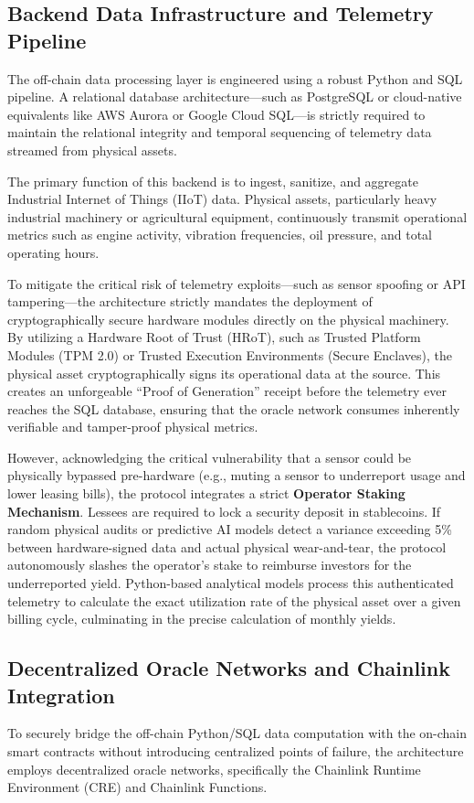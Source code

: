 \documentclass[12pt, a4paper]{article}
\begin{document}
\subsection{Backend Data Infrastructure and Telemetry Pipeline}
The off-chain data processing layer is engineered using a robust Python and SQL pipeline. A relational database architecture—such as PostgreSQL or cloud-native equivalents like AWS Aurora or Google Cloud SQL—is strictly required to maintain the relational integrity and temporal sequencing of telemetry data streamed from physical assets.

The primary function of this backend is to ingest, sanitize, and aggregate Industrial Internet of Things (IIoT) data. Physical assets, particularly heavy industrial machinery or agricultural equipment, continuously transmit operational metrics such as engine activity, vibration frequencies, oil pressure, and total operating hours.

To mitigate the critical risk of telemetry exploits—such as sensor spoofing or API tampering—the architecture strictly mandates the deployment of cryptographically secure hardware modules directly on the physical machinery. By utilizing a Hardware Root of Trust (HRoT), such as Trusted Platform Modules (TPM 2.0) or Trusted Execution Environments (Secure Enclaves), the physical asset cryptographically signs its operational data at the source. This creates an unforgeable ``Proof of Generation'' receipt before the telemetry ever reaches the SQL database, ensuring that the oracle network consumes inherently verifiable and tamper-proof physical metrics. 

However, acknowledging the critical vulnerability that a sensor could be physically bypassed pre-hardware (e.g., muting a sensor to underreport usage and lower leasing bills), the protocol integrates a strict \textbf{Operator Staking Mechanism}. Lessees are required to lock a security deposit in stablecoins. If random physical audits or predictive AI models detect a variance exceeding 5\% between hardware-signed data and actual physical wear-and-tear, the protocol autonomously slashes the operator's stake to reimburse investors for the underreported yield. Python-based analytical models process this authenticated telemetry to calculate the exact utilization rate of the physical asset over a given billing cycle, culminating in the precise calculation of monthly yields.

\subsection{Decentralized Oracle Networks and Chainlink Integration}
To securely bridge the off-chain Python/SQL data computation with the on-chain smart contracts without introducing centralized points of failure, the architecture employs decentralized oracle networks, specifically the Chainlink Runtime Environment (CRE) and Chainlink Functions.
\end{document}
